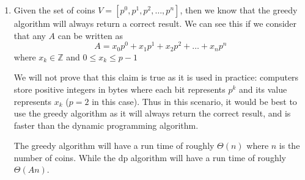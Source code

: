 \documentclass[paper=a4, fontsize=11pt]{scrartcl} %
\numberwithin{equation}{section} %
\numberwithin{figure}{section} %
\numberwithin{table}{section} %
\begin{document}
\begin{enumerate}
    \item
    Given the set of coins $V = [p^0, p^1, p^2, \ldots, p^n]$, then we know
    that the greedy algorithm will always return a correct result. We can see
    this if we consider that any $A$ can be written as 
    \[ A = x_0p^0 + x_1p^1 + x_2p^2 + \ldots + x_np^n \]
    where $x_k \in \mathbb{Z}$ and $0 \leq x_k \leq p - 1$
    
    We will not prove that this claim is true as it is used in practice: 
    computers store positive integers in bytes where each bit represents $p^k$ 
    and its value represents $x_k$ ($p = 2$ in this case). Thus in this 
    scenario, it would be best to use the greedy algorithm as it will always 
    return the correct result, and is faster than the dynamic programming 
    algorithm. 

    The greedy algorithm will have a run time of roughly $\Theta(n)$ where $n$
    is the number of coins. While the dp algorithm will have a run time of
    roughly $\Theta(An)$.
    
\end{enumerate}
\end{document}
